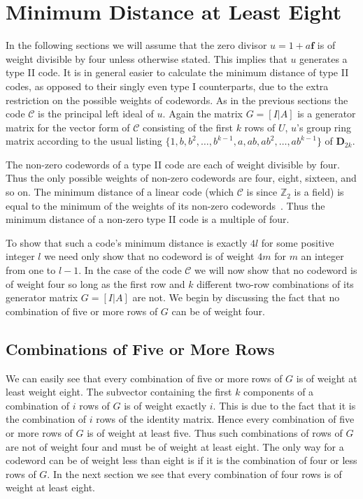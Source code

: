\section{Minimum Distance at Least Eight}
\label{sect:mindisteight}
In the following sections we will assume that the zero divisor $u = 1 + a \mathbf{f}$ is of weight divisible by four unless otherwise stated.
This implies that $u$ generates a type II code.
It is in general easier to calculate the minimum distance of type II codes, as opposed to their singly even type I counterparts, due to the extra restriction on the possible weights of codewords.
As in the previous sections the code $\mathcal{C}$ is the principal left ideal of $u$.
Again the matrix $G = [I|A]$ is a generator matrix for the vector form of $\mathcal{C}$ consisting of the first $k$ rows of $U$, $u$'s group ring matrix according to the usual listing $\{1,b,b^2,\ldots,b^{k-1},a,ab,ab^2,\ldots,ab^{k-1}\}$ of $\mathbf{D}_{2k}$.

The non-zero codewords of a type II code are each of weight divisible by four.
Thus the only possible weights of non-zero codewords are four, eight, sixteen, and so on.
The minimum distance of a linear code (which $\mathcal{C}$ is since $\mathbb{Z}_2$ is a field) is equal to the minimum of the weights of its non-zero codewords~\cite[p.~8]{huf03}.
Thus the minimum distance of a non-zero type II code is a multiple of four.

To show that such a code's minimum distance is exactly $4l$ for some positive integer $l$ we need only show that no codeword is of weight $4m$ for $m$ an integer from one to $l-1$.
In the case of the code $\mathcal{C}$ we will now show that no codeword is of weight four so long as the first row and $k$ different two-row combinations of its generator matrix $G=[I|A]$ are not.
We begin by discussing the fact that no combination of five or more rows of $G$ can be of weight four.

\subsection{Combinations of Five or More Rows}
We can easily see that every combination of five or more rows of $G$ is of weight at least weight eight.
The subvector containing the first $k$ components of a combination of $i$ rows of $G$ is of weight exactly $i$.
This is due to the fact that it is the combination of $i$ rows of the identity matrix.
Hence every combination of five or more rows of $G$ is of weight at least five.
Thus such combinations of rows of $G$ are not of weight four and must be of weight at least eight.
The only way for a codeword can be of weight less than eight is if it is the combination of four or less rows of $G$.
In the next section we see that every combination of four rows is of weight at least eight.

